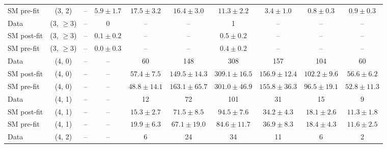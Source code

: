 {\begin{table}[h!]
{\begin{tabular}{lccccccccc}
    SM pre-fit  & (3, 2)           & --                  & $5.9\pm{ 1.7 }$     & $17.5\pm{ 3.2 }$   & $16.4\pm{ 3.0 }$   & $11.3\pm{ 2.2 }$   & $3.4\pm{ 1.0 }$    & $0.8\pm{ 0.3 }$   & $0.9\pm{ 0.3 }$   \\[0.5ex] 
    Data        & (3, $\ge3$)      & --                  & 0                   & --                 & --                 & 1                  & --                 & --                & --                \\[0.5ex] 
    SM post-fit & (3, $\ge3$)      & --                  & $0.1\pm{ 0.2 }$     & --                 & --                 & $0.5\pm{ 0.2 }$    & --                 & --                & --                \\[0.5ex] 
    SM pre-fit  & (3, $\ge3$)      & --                  & $0.0\pm{ 0.3 }$     & --                 & --                 & $0.4\pm{ 0.2 }$    & --                 & --                & --                \\[0.5ex] 
    Data        & (4, 0)           & --                  & --                  & 60                 & 148                & 308                & 157                & 104               & 60                \\[0.5ex] 
    SM post-fit & (4, 0)           & --                  & --                  & $57.4\pm{ 7.5 }$   & $149.5\pm{ 14.3 }$ & $309.1\pm{ 16.5 }$ & $156.9\pm{ 12.4 }$ & $102.2\pm{ 9.6 }$ & $56.6\pm{ 6.2 }$  \\[0.5ex] 
    SM pre-fit  & (4, 0)           & --                  & --                  & $48.8\pm{ 14.1 }$  & $163.1\pm{ 65.7 }$ & $301.0\pm{ 46.9 }$ & $155.8\pm{ 36.3 }$ & $96.5\pm{ 19.1 }$ & $52.8\pm{ 11.3 }$ \\[0.5ex] 
    Data        & (4, 1)           & --                  & --                  & 12                 & 72                 & 101                & 31                 & 15                & 9                 \\[0.5ex] 
    SM post-fit & (4, 1)           & --                  & --                  & $15.3\pm{ 2.7 }$   & $71.5\pm{ 8.5 }$   & $94.5\pm{ 7.6 }$   & $34.2\pm{ 4.3 }$   & $18.1\pm{ 2.6 }$  & $11.3\pm{ 1.8 }$  \\[0.5ex] 
    SM pre-fit  & (4, 1)           & --                  & --                  & $19.9\pm{ 6.3 }$   & $67.1\pm{ 19.0 }$  & $84.6\pm{ 11.7 }$  & $36.9\pm{ 8.3 }$   & $18.4\pm{ 4.3 }$  & $11.6\pm{ 2.5 }$  \\[0.5ex] 
    Data        & (4, 2)           & --                  & --                  & 6                  & 24                 & 34                 & 11                 & 6                 & 2                 \\[0.5ex] 

\end{tabular}}
\end{table}}
